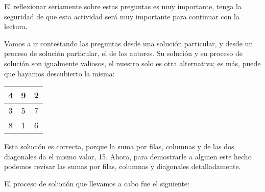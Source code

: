 El reflexionar seriamente sobre estas preguntas es muy importante,
tenga la seguridad de que esta actividad será muy importante para 
continuar con la lectura.

Vamos a ir contestando las preguntas desde una solución particular,
y desde un proceso de solución particular, el de los autores. Su
solución y su proceso de solución son igualmente valiosos, el 
nuestro solo es otra alternativa; es más, puede que hayamos descubierto la misma:

\begin{center}
\begin{tabular}{|c|c|c|}
\hline 
4 & 9 & 2\tabularnewline
\hline
3 & 5 & 7\tabularnewline
\hline 
8 & 1 & 6 \tabularnewline
\hline
\end{tabular}
\end{center}


Esta solución es correcta, porque la suma por filas, columnas y de
 las dos diagonales da el mismo valor, 15. Ahora, para demostrarle
a alguien este hecho podemos revisar las sumas por filas, columnas y 
diagonales detalladamente.

% 

El proceso de solución que llevamos a cabo fue el siguiente:

